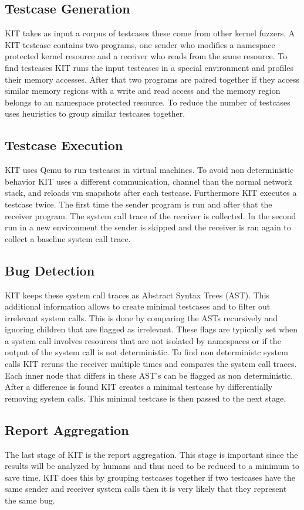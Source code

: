 \documentclass[10pt,twocolumn,a4paper]{article}
\begin{document}
\subsection{Testcase Generation}
KIT takes as input a corpus of testcases these come from other kernel fuzzers.
A KIT testcase contains two programs, one sender who modifies a namespace protected kernel
resource and a receiver who reads from the same resource. To find testcases
KIT runs the input testcases in a special environment and profiles their memory accesses. 
After that two programs are paired together if they access similar memory regions with a write and
read access and the memory region belongs to an namespace protected resource.
To reduce the number of testcases uses heuristics to group similar testcases together.


\subsection{Testcase Execution}
KIT uses Qemu to run testcases in virtual machines. To avoid non deterministic behavior KIT uses
a different communication, channel than the normal network stack, and reloads vm snapshots after
each testcase. Furthermore KIT  executes a
testcase twice. The first time the sender program is run and after that the receiver program. The
system call trace of the receiver is collected. In the second  run in a new environment the sender is skipped and the receiver
is ran again to collect a baseline system call trace\cite{0}. 
\subsection{Bug Detection}
KIT keeps these system call traces as Abstract Syntax Trees (AST). This additional information allows 
to create minimal testcases and to filter out irrelevant system calls. This is done by comparing the ASTs
recursively and ignoring children that are flagged as irrelevant. These flags are typically set when
a system call involves resources that are not isolated by namespaces or if the output of the
system call is not deterministic. To find non deterministc system calls KIT  reruns the receiver multiple times and
compares the system call traces. Each inner node that differs in these AST's can be flagged as non
deterministic.
After a difference is found KIT creates a minimal testcase by differentially removing system calls. This
minimal testcase is then passed to the next stage\cite{0}.
\subsection{Report Aggregation}
The last stage of KIT is the report aggregation. This stage is important since the results will be
analyzed by humans and thus need to be reduced to a minimum to save time. KIT does this by grouping
testcases together if two testcases have the same sender and receiver system calls then it is very
likely that they represent the same bug\cite{0}. 
\end{document}
